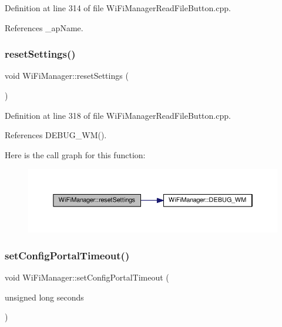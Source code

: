 Definition at line 314 of file Wi\+Fi\+Manager\+Read\+File\+Button.\+cpp.



References \+\_\+ap\+Name.

\mbox{\label{class_wi_fi_manager_a0027749816b6c66bc845d7c5db760a33}} 
\subsubsection{\texorpdfstring{reset\+Settings()}{resetSettings()}}
{\footnotesize\ttfamily void Wi\+Fi\+Manager\+::reset\+Settings (\begin{DoxyParamCaption}{ }\end{DoxyParamCaption})}



Definition at line 318 of file Wi\+Fi\+Manager\+Read\+File\+Button.\+cpp.



References D\+E\+B\+U\+G\+\_\+\+W\+M().

Here is the call graph for this function\+:
\nopagebreak
\begin{figure}[H]
\begin{center}
\leavevmode
\includegraphics[width=350pt]{d4/dc8/class_wi_fi_manager_a0027749816b6c66bc845d7c5db760a33_cgraph}
\end{center}
\end{figure}
\mbox{\label{class_wi_fi_manager_a904006cb4d2c769e93bfdef336853766}} 
\subsubsection{\texorpdfstring{set\+Config\+Portal\+Timeout()}{setConfigPortalTimeout()}}
{\footnotesize\ttfamily void Wi\+Fi\+Manager\+::set\+Config\+Portal\+Timeout (\begin{DoxyParamCaption}\item[{unsigned long}]{seconds }\end{DoxyParamCaption})}



